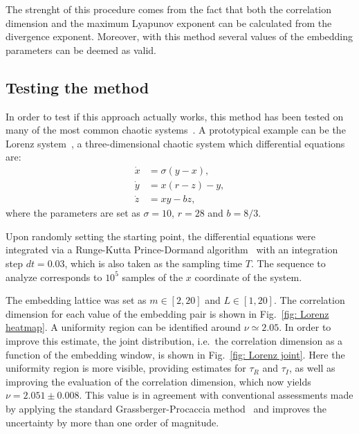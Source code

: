 The strenght of this procedure comes from the fact that both the correlation dimension and the
maximum Lyapunov exponent can be calculated from the divergence exponent.
Moreover, with this method several
values of the embedding parameters can be deemed as valid.


\subsection{Testing the method}\label{subsec: testing the procedure}

In order to test if this approach actually works, this method has been tested on many of the most
common chaotic systems~\cite{ref:perinelli2020chasing}. 
A prototypical example can be the Lorenz system~\cite{lorenz1963deterministic}, a three-dimensional
chaotic system which differential equations are:
\begin{equation}
\label{eq: Lorenz system}
\begin{aligned}
    \dot{x}&=\sigma(y-x),\\
    \dot{y}&=x(r-z)-y,\\
    \dot{z}&=xy-bz,
\end{aligned}
\end{equation}
where the parameters are set as $\sigma=10$, $r=28$ and $b=8/3$.

Upon randomly setting the starting point, the differential equations were integrated via
a Runge-Kutta Prince-Dormand algorithm~\cite{dormand1986runge} with an integration
step $dt = 0.03$, which is also taken as the sampling time $T$.
The sequence to analyze corresponds to $10^5$ samples of the $x$ coordinate of the system.

The embedding lattice was set as $m\in[2,20]$ and $L\in[1,20]$. 
The correlation dimension for each value of the embedding pair is shown in Fig.~\ref{fig: Lorenz heatmap}.
A uniformity region can be identified around $\nu\simeq2.05$.
In order to improve this estimate, the joint distribution, i.e.\ the correlation dimension as a function
of the embedding window, is shown in Fig.~\ref{fig: Lorenz joint}.
Here the uniformity region is more visible, providing estimates for $\tau_R$ and $\tau_I$, as well as
improving the evaluation of the correlation dimension, which now yields $\nu=2.051 \pm 0.008$.
This value is in agreement with
conventional assessments made by applying the standard Grassberger-Procaccia method~\cite{ref:bradley2015nonlinear,sprott2001improved}
and improves the uncertainty by more than one order of magnitude.

